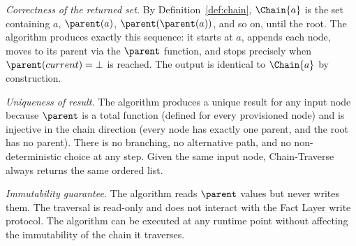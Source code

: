 \textit{Correctness of the returned set.} By Definition~\ref{def:chain}, $\Chain{a}$ is the set containing $a$, $\parent(a)$, $\parent(\parent(a))$, and so on, until the root. The algorithm produces exactly this sequence: it starts at $a$, appends each node, moves to its parent via the $\parent$ function, and stops precisely when $\parent(current) = \bot$ is reached. The output is identical to $\Chain{a}$ by construction.

\textit{Uniqueness of result.} The algorithm produces a unique result for any input node because $\parent$ is a total function (defined for every provisioned node) and is injective in the chain direction (every node has exactly one parent, and the root has no parent). There is no branching, no alternative path, and no non-deterministic choice at any step. Given the same input node, Chain-Traverse always returns the same ordered list.

\textit{Immutability guarantee.} The algorithm reads $\parent$ values but never writes them. The traversal is read-only and does not interact with the Fact Layer write protocol. The algorithm can be executed at any runtime point without affecting the immutability of the chain it traverses.

